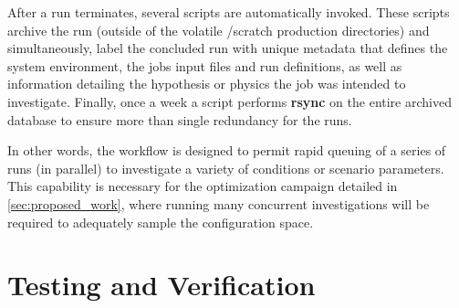 After a run terminates, several scripts are automatically invoked. 
These scripts archive the run (outside of the volatile /scratch 
production directories) and simultaneously, label the concluded run with
unique metadata that defines the system environment, the jobs input
files and run definitions, as well as information detailing the
hypothesis or physics the job was intended to investigate. Finally, once
a week a script performs \textbf{rsync} on the entire archived database to
ensure more than single redundancy for the runs. 

In other words, the workflow is designed to permit rapid queuing of a
series of runs (in parallel) to investigate a variety of conditions or
scenario parameters. This capability is necessary for the optimization
campaign detailed in \ref{sec:proposed_work}, where running many
concurrent investigations will be required to adequately sample the
configuration space.  

\section{Testing and Verification}